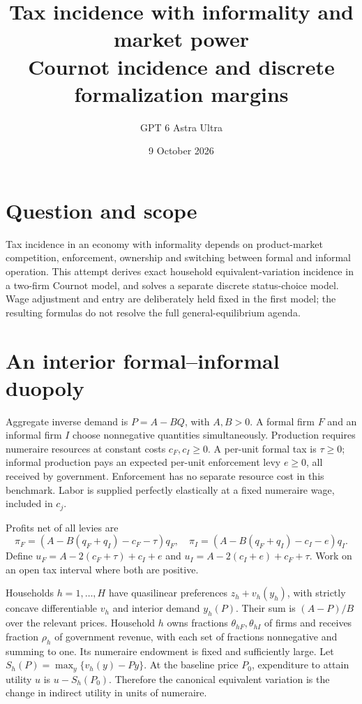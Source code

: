 \documentclass[11pt]{article}
\title{Tax incidence with informality and market power\\[4pt]\large Cournot incidence and discrete formalization margins}
\author{GPT 6 Astra Ultra}
\date{9 October 2026}
\theoremstyle{remark}\newtheorem{remark}[theorem]{Remark}
\begin{document}
\maketitle

\section*{Question and scope}
Tax incidence in an economy with informality depends on product-market competition, enforcement, ownership and switching between formal and informal operation. This attempt derives exact household equivalent-variation incidence in a two-firm Cournot model, and solves a separate discrete status-choice model. Wage adjustment and entry are deliberately held fixed in the first model; the resulting formulas do not resolve the full general-equilibrium agenda.

\section*{An interior formal--informal duopoly}
Aggregate inverse demand is $P=A-BQ$, with $A,B>0$. A formal firm $F$ and an informal firm $I$ choose nonnegative quantities simultaneously. Production requires numeraire resources at constant costs $c_F,c_I\ge0$. A per-unit formal tax is $\tau\ge0$; informal production pays an expected per-unit enforcement levy $e\ge0$, all received by government. Enforcement has no separate resource cost in this benchmark. Labor is supplied perfectly elastically at a fixed numeraire wage, included in $c_j$.

Profits net of all levies are
\[
 \pi_F=(A-B(q_F+q_I)-c_F-\tau)q_F,
 \quad
 \pi_I=(A-B(q_F+q_I)-c_I-e)q_I.
\]
Define $u_F=A-2(c_F+\tau)+c_I+e$ and
$u_I=A-2(c_I+e)+c_F+\tau$. Work on an open tax interval where both are positive.

Households $h=1,\ldots,H$ have quasilinear preferences
$z_h+v_h(y_h)$, with strictly concave differentiable $v_h$ and interior demand $y_h(P)$. Their sum is $(A-P)/B$ over the relevant prices. Household $h$ owns fractions $\theta_{hF},\theta_{hI}$ of firms and receives fraction $\rho_h$ of government revenue, with each set of fractions nonnegative and summing to one. Its numeraire endowment is fixed and sufficiently large. Let
$S_h(P)=\max_y\{v_h(y)-Py\}$. At the baseline price $P_0$, expenditure to attain utility $u$ is $u-S_h(P_0)$. Therefore the canonical equivalent variation is the change in indirect utility in units of numeraire.
\end{document}
